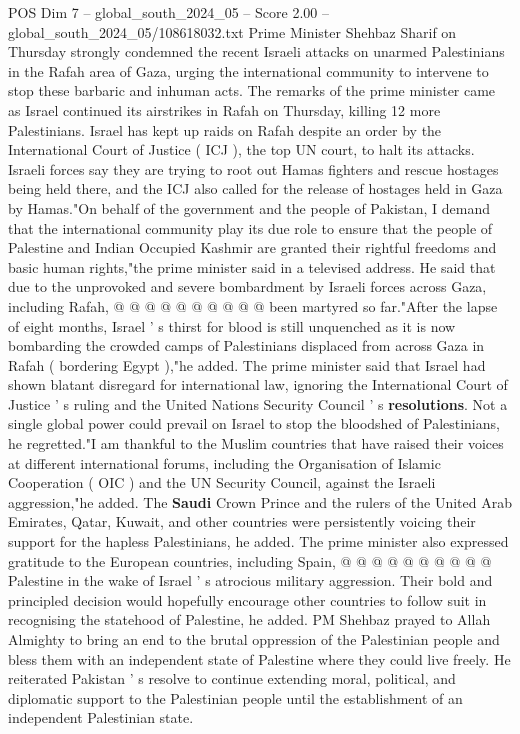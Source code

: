 \begin{textsample}{POS Dim 7 – global\_south\_2024\_05 – Score 2.00 – global\_south\_2024\_05/108618032.txt}  \label{ex:f7_pos_069}
Prime Minister Shehbaz Sharif on Thursday strongly condemned the recent Israeli attacks on unarmed Palestinians in the Rafah area of Gaza, urging the international community to intervene to stop these barbaric and inhuman acts.
The remarks of the prime minister came as Israel continued its airstrikes in Rafah on Thursday, killing 12 more Palestinians.
Israel has kept up raids on Rafah despite an order by the International Court of Justice ( ICJ ), the top UN court, to halt its attacks.
Israeli forces say they are trying to root out Hamas fighters and rescue hostages being held there, and the ICJ also called for the release of hostages held in Gaza by Hamas."On behalf of the government and the people of Pakistan, I demand that the international community play its due role to ensure that the people of Palestine and Indian Occupied Kashmir are granted their rightful freedoms and basic human rights,"the prime minister said in a televised address.
He said that due to the unprovoked and severe bombardment by Israeli forces across Gaza, including Rafah, @ @ @ @ @ @ @ @ @ @ been martyred so far."After the lapse of eight months, Israel ' s thirst for blood is still unquenched as it is now bombarding the crowded camps of Palestinians displaced from across Gaza in Rafah ( bordering Egypt ),"he added.
The prime minister said that Israel had shown blatant disregard for international law, ignoring the International Court of Justice ' s ruling and the United Nations Security Council ' s \textbf{resolutions}.
Not a single global power could prevail on Israel to stop the bloodshed of Palestinians, he regretted."I am thankful to the Muslim countries that have raised their voices at different international forums, including the Organisation of Islamic Cooperation ( OIC ) and the UN Security Council, against the Israeli aggression,"he added.
The \textbf{Saudi} Crown Prince and the rulers of the United Arab Emirates, Qatar, Kuwait, and other countries were persistently voicing their support for the hapless Palestinians, he added.
The prime minister also expressed gratitude to the European countries, including Spain, @ @ @ @ @ @ @ @ @ @ Palestine in the wake of Israel ' s atrocious military aggression.
Their bold and principled decision would hopefully encourage other countries to follow suit in recognising the statehood of Palestine, he added.
PM Shehbaz prayed to Allah Almighty to bring an end to the brutal oppression of the Palestinian people and bless them with an independent state of Palestine where they could live freely.
He reiterated Pakistan ' s resolve to continue extending moral, political, and diplomatic support to the Palestinian people until the establishment of an independent Palestinian state.

\end{textsample}
